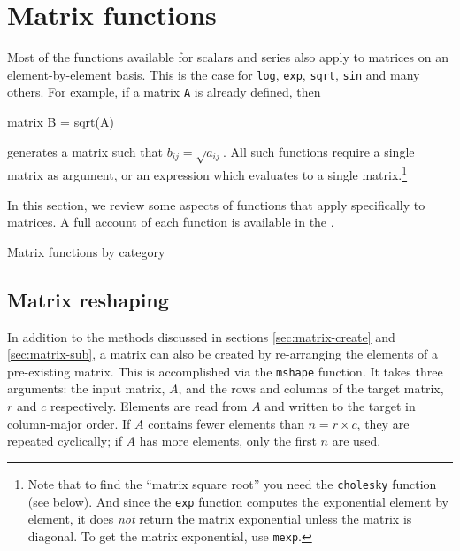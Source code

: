 \section{Matrix functions}
\label{sec:matrix-func}

Most of the functions available for scalars and series also apply to
matrices on an element-by-element basis. This is the case for
\texttt{log}, \texttt{exp}, \texttt{sqrt}, \texttt{sin} and many
others. For example, if a matrix \texttt{A} is already defined, then
%
\begin{code}
matrix B = sqrt(A)
\end{code}
%
generates a matrix such that $b_{ij} = \sqrt{a_{ij}}$.  All such
functions require a single matrix as argument, or an expression which
evaluates to a single matrix.\footnote{Note that to find the ``matrix
  square root'' you need the \texttt{cholesky} function (see below).
  And since the \texttt{exp} function computes the exponential element
  by element, it does \emph{not} return the matrix exponential unless
  the matrix is diagonal. To get the matrix exponential, use
  \texttt{mexp}.}

In this section, we review some aspects of functions that apply
specifically to matrices. A full account of each function is available
in the \GCR.

\newlength{\cwid}
\setlength{\cwid}{0.1\textwidth}

\begin{table}[htbp]
\centering

\caption{Matrix functions by category}
\label{tab:matrix_funcs_cat}
\end{table}

\subsection{Matrix reshaping}
\label{matrix-mshape}

In addition to the methods discussed in sections
\ref{sec:matrix-create} and \ref{sec:matrix-sub}, a matrix can also be
created by re-arranging the elements of a pre-existing matrix. This is
accomplished via the \texttt{mshape} function. It takes three
arguments: the input matrix, $A$, and the rows and columns of the
target matrix, $r$ and $c$ respectively.  Elements are read from $A$
and written to the target in column-major order.  If $A$ contains
fewer elements than $n = r \times c$, they are repeated cyclically; if
$A$ has more elements, only the first $n$ are used.

